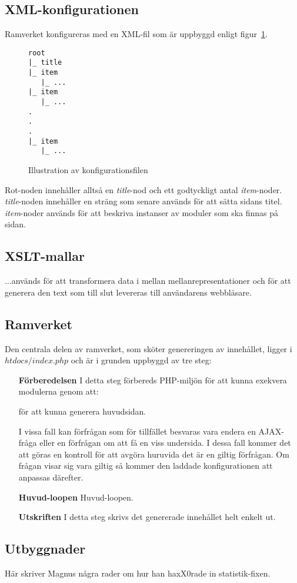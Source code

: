 \subsection{XML-konfigurationen}
Ramverket konfigureras med en XML-fil som är uppbyggd enligt
figur~\ref{fig:xml-config}.

\begin{figure}[h]
\begin{verbatim}
root
|_ title
|_ item
   |_ ...
|_ item
   |_ ...
.
.
.
|_ item
   |_ ...
\end{verbatim}
\caption{Illustration av konfigurationsfilen}
\label{fig:xml-config}
\end{figure}

Rot-noden innehåller alltså en {\it title}-nod och ett godtyckligt antal
{\it item}-noder. {\it title}-noden innehåller en sträng som senare används för
att sätta sidans titel. {\it item}-noder används för att beskriva instanser av
moduler som ska finnas på sidan.

\subsection{XSLT-mallar}
...används för att transformera data i mellan mellanrepresentationer och för att
generera den text som till slut levereras till användarens webbläsare.

\subsection{Ramverket}

Den centrala delen av ramverket, som sköter genereringen av innehållet, ligger
i $htdocs/index.php$ och är i grunden uppbyggd av tre steg:

\begin{itemize}
  \item[\bf Förberedelsen]
    I detta steg förbereds PHP-miljön för att kunna exekvera modulerna genom
    att:
    för att kunna generera huvudsidan.

    I vissa fall kan förfrågan som för tillfället besvaras vara endera en
    AJAX-fråga eller en förfrågan om att få en viss undersida. I dessa fall
    kommer det att göras en kontroll för att avgöra huruvida det är en giltig
    förfrågan. Om frågan visar sig vara giltig så kommer den laddade
    konfigurationen att anpassas därefter.
  \item[\bf Huvud-loopen]
    Huvud-loopen.

  \item[\bf Utskriften]
    I detta steg skrivs det genererade innehållet helt enkelt ut.
\end{itemize}

\subsection{Utbyggnader}
Här skriver Magnus några rader om hur han haxX0rade in statistik-fixen.
